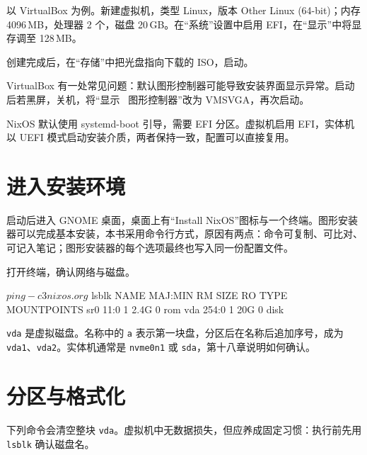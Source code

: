 以 VirtualBox 为例。新建虚拟机，类型 Linux，版本 Other Linux (64-bit)；内存 4096\,MB，处理器 2 个，磁盘 20\,GB。在“系统”设置中启用 EFI，在“显示”中将显存调至 128\,MB。

创建完成后，在“存储”中把光盘指向下载的 ISO，启动。

VirtualBox 有一处常见问题：默认图形控制器可能导致安装界面显示异常。启动后若黑屏，关机，将“显示 \textrightarrow\ 图形控制器”改为 VMSVGA，再次启动。

\begin{notebox}
NixOS 默认使用 systemd-boot 引导，需要 EFI 分区。虚拟机启用 EFI，实体机以 UEFI 模式启动安装介质，两者保持一致，配置可以直接复用。
\end{notebox}

\section{进入安装环境}

启动后进入 GNOME 桌面，桌面上有“Install NixOS”图标与一个终端。图形安装器可以完成基本安装，本书采用命令行方式，原因有两点：命令可复制、可比对、可记入笔记；图形安装器的每个选项最终也写入同一份配置文件。

打开终端，确认网络与磁盘。

\begin{shellsession}
$ ping -c 3 nixos.org
$ lsblk
NAME   MAJ:MIN RM  SIZE RO TYPE MOUNTPOINTS
sr0     11:0    1  2.4G  0 rom
vda    254:0    1   20G  0 disk
\end{shellsession}

\texttt{vda} 是虚拟磁盘。名称中的 \texttt{a} 表示第一块盘，分区后在名称后追加序号，成为 \texttt{vda1}、\texttt{vda2}。实体机通常是 \texttt{nvme0n1} 或 \texttt{sda}，第十八章说明如何确认。

\section{分区与格式化}

下列命令会清空整块 \texttt{vda}。虚拟机中无数据损失，但应养成固定习惯：执行前先用 \texttt{lsblk} 确认磁盘名。


